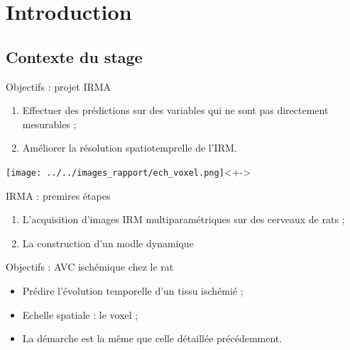 \section{Introduction}

\subsection{Contexte du stage}


\begin{frame}
\begin{block}{Objectifs : projet IRMA}
\begin{enumerate}
\item<+-> Effectuer des pr\'edictions sur des variables qui ne sont pas directement mesurables ;
\item<+-> Am\'eliorer la r\'esolution spatiotemprelle de l'IRM.
\end{enumerate}
\end{block}
\texttt{[image: ../../images\_rapport/ech\_voxel.png]}<+->
\end{frame}

\begin{frame}
\begin{block}{IRMA : premires \'etapes}
\begin{enumerate}
\item<+-> L'acquisition d'images IRM multiparam\'etriques sur des cerveaux de rats ;
\item<+-> La construction d'un modle dynamique 
\end{enumerate}
\end{block}
\end{frame}


\begin{frame}{Objectifs : AVC isch\'emique chez le rat}
\begin{itemize}
\item<+-> Pr\'edire l'\'evolution temporelle d'un tissu isch\'emi\'e ;
\item<+-> Echelle spatiale : le voxel ;
\item<+-> La d\'emarche est la m\^eme que celle d\'etaill\'ee pr\'ec\'edemment.
\end{itemize}
\end{frame}




